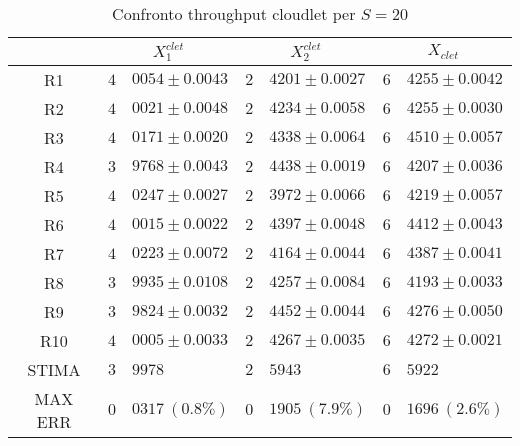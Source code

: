 \begin{table}[!h]
\begin{tabular}{c|r@{.}l|r@{.}l|r@{.}l}
& \multicolumn{2}{|c|}{$X_1^{clet}$}
& \multicolumn{2}{|c|}{$X_2^{clet}$}
& \multicolumn{2}{|c}{$X_{clet}$} 
\\          
\hline
R1      & $4$&$0054 \pm 0.0043$ & $2$&$4201 \pm 0.0027$ & $6$&$4255 \pm 0.0042$ \\
R2      & $4$&$0021 \pm 0.0048$ & $2$&$4234 \pm 0.0058$ & $6$&$4255 \pm 0.0030$ \\
R3      & $4$&$0171 \pm 0.0020$ & $2$&$4338 \pm 0.0064$ & $6$&$4510 \pm 0.0057$ \\
R4      & $3$&$9768 \pm 0.0043$ & $2$&$4438 \pm 0.0019$ & $6$&$4207 \pm 0.0036$ \\
R5      & $4$&$0247 \pm 0.0027$ & $2$&$3972 \pm 0.0066$ & $6$&$4219 \pm 0.0057$ \\
R6      & $4$&$0015 \pm 0.0022$ & $2$&$4397 \pm 0.0048$ & $6$&$4412 \pm 0.0043$ \\
R7      & $4$&$0223 \pm 0.0072$ & $2$&$4164 \pm 0.0044$ & $6$&$4387 \pm 0.0041$ \\
R8      & $3$&$9935 \pm 0.0108$ & $2$&$4257 \pm 0.0084$ & $6$&$4193 \pm 0.0033$ \\
R9      & $3$&$9824 \pm 0.0032$ & $2$&$4452 \pm 0.0044$ & $6$&$4276 \pm 0.0050$ \\
R10     & $4$&$0005 \pm 0.0033$ & $2$&$4267 \pm 0.0035$ & $6$&$4272 \pm 0.0021$ \\
STIMA   & $3$&$9978$            & $2$&$5943$            & $6$&$5922$            \\
MAX ERR & $0$&$0317 \ (0.8\%)$  & $0$&$1905 \ (7.9\%)$  & $0$&$1696 \ (2.6\%)$    
\end{tabular}
\centering
\caption{Confronto throughput cloudlet per $S=20$}
\label{tab:20_xclet}
\end{table}
